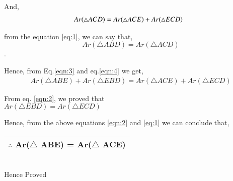 \documentclass[journal,12pt,twocolumn]{IEEEtran}
\begin{document}
\raggedright
And,
\begin{align}
Ar(\triangle ACD) = Ar(\triangle ACE) + Ar(\triangle ECD)\hspace{0.25cm} 
\label{eqn:4}
\end{align}
\raggedright
from the equation \ref{eq:1}, we can say that,
\centering
$$Ar(\triangle ABD)=Ar(\triangle ACD)$$.
\raggedright
Hence, from Eq.\ref{eqn:3} and eq.\ref{eqn:4} we get,\\
\vspace{0.25cm}
\raggedleft
\begin{align}
Ar(\triangle ABE) + Ar(\triangle EBD) =Ar(\triangle ACE) + Ar(\triangle ECD)
\end{align}
\vspace{0.25cm}
\raggedright
From eq. \ref{eqn:2}, we proved that\\
\centering
\vspace{0.25cm} 
$Ar(\triangle EBD)=Ar(\triangle ECD)$\\
\vspace{0.25cm}
\raggedright
Hence, from the above equations \ref{eqn:2} and \ref{eq:1} we can conclude that,\\
\vspace{0.25cm}
\centering
\begin{tabular}{|c|}
\hline
$\therefore$ Ar($\triangle$ ABE) = Ar($\triangle$ ACE)\\
\hline
\end{tabular}\\
\vspace{0.5cm}
Hence Proved
\end{document}
